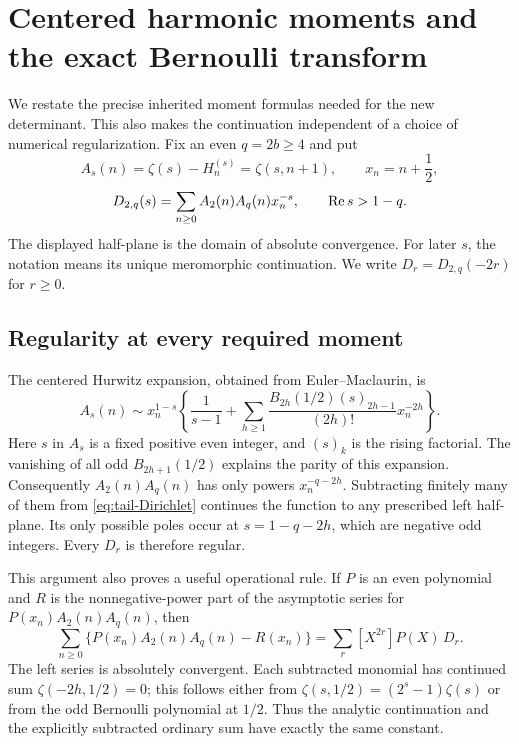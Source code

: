 \section{Centered harmonic moments and the exact Bernoulli transform}
\label{sec:tail-foundation}

We restate the precise inherited moment formulas needed for the new
determinant. This also makes the continuation independent of a
choice of numerical regularization. Fix an even $q=2b\ge4$ and put
\[
 A_s(n)=\zeta(s)-H_n^{(s)}=\zeta(s,n+1),\qquad x_n=n+\frac12,
\]
\begin{equation}\label{eq:tail-Dirichlet}
 D_{2,q}(s)=\sum_{n\ge0} A_2(n)A_q(n)x_n^{-s},
 \qquad \operatorname{Re} s>1-q.
\end{equation}
The displayed half-plane is the domain of absolute convergence.
For later $s$, the notation means its unique meromorphic continuation.
We write $D_r=D_{2,q}(-2r)$ for $r\ge0$.

\subsection{Regularity at every required moment}

The centered Hurwitz expansion, obtained from Euler--Maclaurin, is
\begin{equation}\label{eq:centered-hurwitz-foundation}
 A_s(n)\sim x_n^{1-s}\left\{
 \frac1{s-1}+\sum_{h\ge1}
    \frac{B_{2h}(1/2)(s)_{2h-1}}{(2h)!}x_n^{-2h}\right\}.
\end{equation}
Here $s$ in $A_s$ is a fixed positive even integer, and
$(s)_k$ is the rising factorial. The vanishing of all odd
$B_{2h+1}(1/2)$ explains the parity of this expansion.
Consequently $A_2(n)A_q(n)$ has only powers $x_n^{-q-2h}$.
Subtracting finitely many of them from \eqref{eq:tail-Dirichlet}
continues the function to any prescribed left half-plane. Its only
possible poles occur at $s=1-q-2h$, which are negative odd integers.
Every $D_r$ is therefore regular.

This argument also proves a useful operational rule. If $P$ is an
even polynomial and $R$ is the nonnegative-power part of the
asymptotic series for $P(x_n)A_2(n)A_q(n)$, then
\begin{equation}\label{eq:ordinary-fp-foundation}
 \sum_{n\ge0}\{P(x_n)A_2(n)A_q(n)-R(x_n)\}
 =\sum_r [X^{2r}]P(X)\,D_r.
\end{equation}
The left series is absolutely convergent. Each subtracted monomial
has continued sum $\zeta(-2h,1/2)=0$; this follows either from
$\zeta(s,1/2)=(2^s-1)\zeta(s)$ or from the odd Bernoulli polynomial
at $1/2$. Thus the analytic continuation and the explicitly subtracted
ordinary sum have exactly the same constant.

